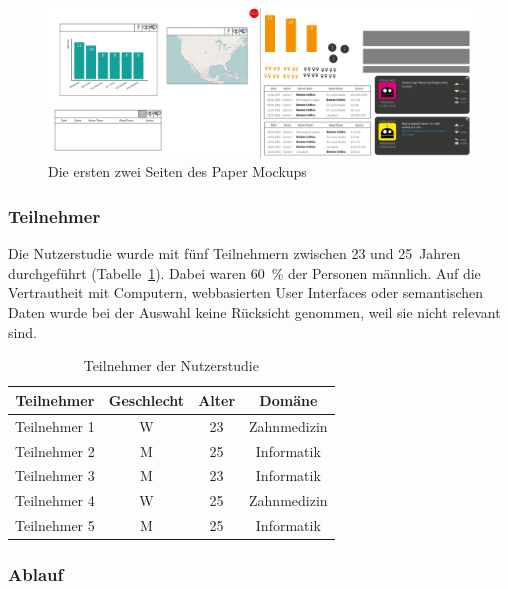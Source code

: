 \documentclass[
	headsepline,
	footsepline,
	fontsize=12pt,
	bibliography=totoc
]{scrbook}
\begin{document}
\begin{figure}[htbp]
   \centering
   \includegraphics[width=\textwidth]{images/konzeption-paper-mockup.png}
   \caption{Die ersten zwei Seiten des Paper Mockups}
   \label{figure:paper-mockup}
\end{figure}

\subsubsection{Teilnehmer}

Die Nutzerstudie wurde mit fünf Teilnehmern zwischen 23 und 25~Jahren durchgeführt (Tabelle~\ref{table:mockup:teilnehmer}). Dabei waren 60~\% der Personen männlich. Auf die Vertrautheit mit Computern, webbasierten User Interfaces oder semantischen Daten wurde bei der Auswahl keine Rücksicht genommen, weil sie nicht relevant sind.

\begin{table}[htbp]
	\centering
    \begin{tabular}{c|c|c|c}
    Teilnehmer   & Geschlecht & Alter & Domäne      \\
    \hline
    Teilnehmer 1 & W          & 23    & Zahnmedizin \\ %
    Teilnehmer 2 & M          & 25    & Informatik  \\ %
    Teilnehmer 3 & M          & 23    & Informatik  \\ %
    Teilnehmer 4 & W          & 25    & Zahnmedizin \\ %
    Teilnehmer 5 & M          & 25    & Informatik  \\ %
    \end{tabular}
    \label{table:mockup:teilnehmer}
    \caption{Teilnehmer der Nutzerstudie}
\end{table}

\subsubsection{Ablauf}
\end{document}

